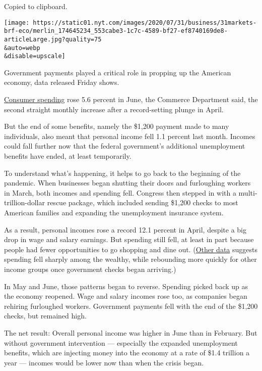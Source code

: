 Copied to clipboard.

\texttt{[image: https://static01.nyt.com/images/2020/07/31/business/31markets-brf-eco/merlin\_174645234\_553cabe3-1c7c-4589-bf27-ef8740169de8-articleLarge.jpg?quality=75\\\&auto=webp\\\&disable=upscale]}

Government payments played a critical role in propping up the American
economy, data released Friday shows.

\href{https://www.bea.gov/news/2020/personal-income-and-outlays-june-2020-and-annual-update}{Consumer
spending} rose 5.6 percent in June, the Commerce Department said, the
second straight monthly increase after a record-setting plunge in April.

But the end of some benefits, namely the \$1,200 payment made to many
individuals, also meant that personal income fell 1.1 percent last
month. Incomes could fall further now that the federal government's
additional unemployment benefits have ended, at least temporarily.

To understand what's happening, it helps to go back to the beginning of
the pandemic. When businesses began shutting their doors and furloughing
workers in March, both incomes and spending fell. Congress then stepped
in with a multi-trillion-dollar rescue package, which included sending
\$1,200 checks to most American families and expanding the unemployment
insurance system.

As a result, personal incomes rose a record 12.1 percent in April,
despite a big drop in wage and salary earnings. But spending still fell,
at least in part because people had fewer opportunities to go shopping
and dine out.
(\href{https://www.nytimes.com/2020/06/17/upshot/coronavirus-spending-rich-poor.html}{Other
data} suggests spending fell sharply among the wealthy, while rebounding
more quickly for other income groups once government checks began
arriving.)

In May and June, those patterns began to reverse. Spending picked back
up as the economy reopened. Wage and salary incomes rose too, as
companies began rehiring furloughed workers. Government payments fell
with the end of the \$1,200 checks, but remained high.

The net result: Overall personal income was higher in June than in
February. But without government intervention --- especially the
expanded unemployment benefits, which are injecting money into the
economy at a rate of \$1.4 trillion a year --- incomes would be lower
now than when the crisis began.

